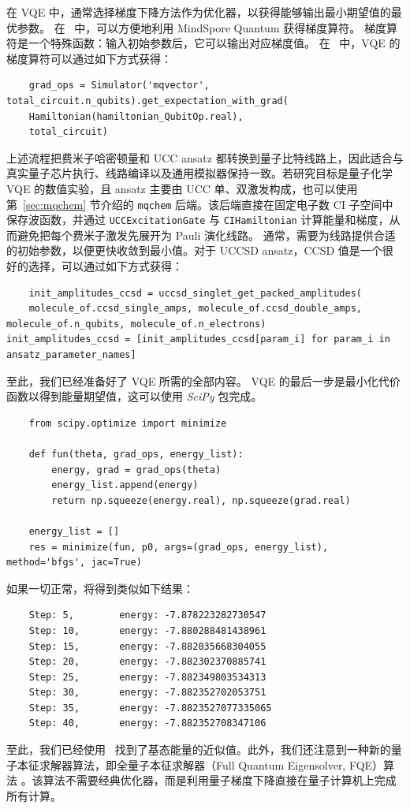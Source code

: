 在 VQE 中，通常选择梯度下降方法作为优化器，以获得能够输出最小期望值的最优参数。
在 \MindQuantum\ 中，可以方便地利用 MindSpore Quantum 获得梯度算符。
梯度算符是一个特殊函数：输入初始参数后，它可以输出对应梯度值。
在 \MindQuantum\ 中，VQE 的梯度算符可以通过如下方式获得：
\begin{lstlisting}
    grad_ops = Simulator('mqvector', total_circuit.n_qubits).get_expectation_with_grad(
    Hamiltonian(hamiltonian_QubitOp.real),
    total_circuit)
\end{lstlisting}
上述流程把费米子哈密顿量和 UCC ansatz 都转换到量子比特线路上，因此适合与真实量子芯片执行、线路编译以及通用模拟器保持一致。若研究目标是量子化学 VQE 的数值实验，且 ansatz 主要由 UCC 单、双激发构成，也可以使用第~\ref{sec:mqchem} 节介绍的 \texttt{mqchem} 后端。该后端直接在固定电子数 CI 子空间中保存波函数，并通过 \texttt{UCCExcitationGate} 与 \texttt{CIHamiltonian} 计算能量和梯度，从而避免把每个费米子激发先展开为 Pauli 演化线路。
通常，需要为线路提供合适的初始参数，以便更快收敛到最小值。对于 UCCSD ansatz，CCSD 值是一个很好的选择，可以通过如下方式获得：
\begin{lstlisting}
    init_amplitudes_ccsd = uccsd_singlet_get_packed_amplitudes(
    molecule_of.ccsd_single_amps, molecule_of.ccsd_double_amps, molecule_of.n_qubits, molecule_of.n_electrons)
init_amplitudes_ccsd = [init_amplitudes_ccsd[param_i] for param_i in ansatz_parameter_names]
\end{lstlisting}
至此，我们已经准备好了 VQE 所需的全部内容。
VQE 的最后一步是最小化代价函数以得到能量期望值，这可以使用 \textit{SciPy} 包完成。
\begin{lstlisting}
    from scipy.optimize import minimize

    def fun(theta, grad_ops, energy_list):
        energy, grad = grad_ops(theta)
        energy_list.append(energy)
        return np.squeeze(energy.real), np.squeeze(grad.real)

    energy_list = []
    res = minimize(fun, p0, args=(grad_ops, energy_list), method='bfgs', jac=True)
\end{lstlisting}
如果一切正常，将得到类似如下结果：
\begin{lstlisting}
    Step: 5,        energy: -7.878223282730547
    Step: 10,       energy: -7.880288481438961
    Step: 15,       energy: -7.882035668304055
    Step: 20,       energy: -7.882302370885741
    Step: 25,       energy: -7.882349803534313
    Step: 30,       energy: -7.882352702053751
    Step: 35,       energy: -7.8823527077335065
    Step: 40,       energy: -7.882352708347106
\end{lstlisting}
至此，我们已经使用 \MindQuantum\ 找到了基态能量的近似值。此外，我们还注意到一种新的量子本征求解器算法，即全量子本征求解器（Full Quantum Eigensolver, FQE）算法 \cite{wei2020full}。该算法不需要经典优化器，而是利用量子梯度下降直接在量子计算机上完成所有计算。
